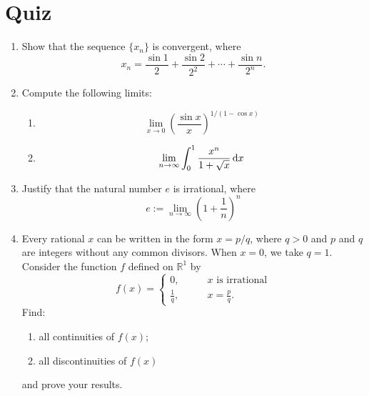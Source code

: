 
\section{Quiz}
\begin{enumerate}
\item
Show that the sequence $\{x_n\}$ is convergent, where
\[
x_n=\frac{\sin 1}{2}+\frac{\sin 2}{2^2}+\cdots+\frac{\sin n}{2^n}.
\]
\item
Compute the following limits:
\begin{enumerate}
\item
\[
\lim_{x\to0}\left(\frac{\sin x}{x}\right)^{1/(1-\cos x)}
\]
\item
\[
\lim_{n\to\infty}\int_0^1\frac{x^n}{1+\sqrt{x}}\,\mathrm{d} x
\]
\end{enumerate}
\item
Justify that the natural number $e$ is irrational, where
\[
e:=\lim_{n\to\infty}\left(1+\frac{1}{n}\right)^n
\]
\item
Every rational $x$ can be written in the form $x=p/q$, where $q>0$ and $p$ and $q$ are integers without any common divisors. When $x=0$, we take $q=1$. Consider the function $f$ defined on $\mathbb{R}^1$ by
\[
f(x)=\left\{
\begin{aligned}
0,&\qquad\mbox{$x$ is irrational}\\
\frac{1}{q},&\qquad\mbox{$x=\frac{p}{q}$}.
\end{aligned}
\right.
\]
Find:
\begin{enumerate}
\item
all continuities of $f(x)$;
\item
all discontinuities of $f(x)$
\end{enumerate}
and prove your results.










\end{enumerate}